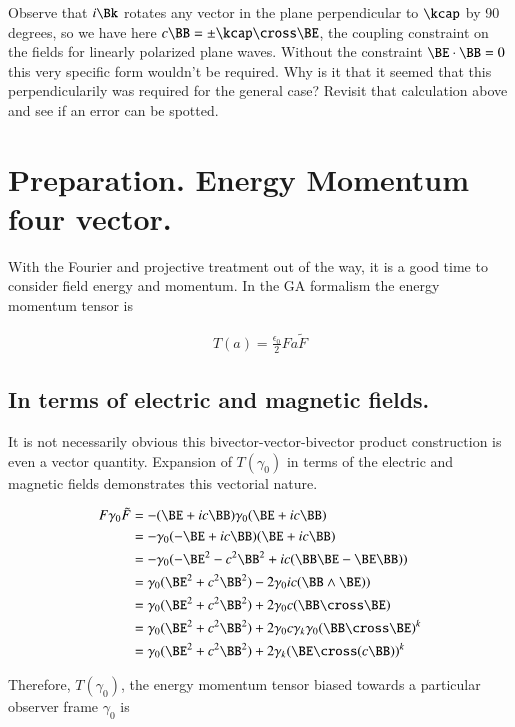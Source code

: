 Observe that $i\Bk$ rotates any vector in the plane perpendicular to $\kcap$ by 90 degrees,
so we have here $c \BB = \pm \kcap \cross \BE$, the coupling constraint on the fields for linearly polarized plane
waves.  Without the constraint $\BE \cdot \BB = 0$ this very specific form wouldn't be required.  Why is it that it seemed
that this perpendicularily was required for the general case?  Revisit that calculation above and see if an error can be spotted.

\section{Preparation.  Energy Momentum four vector.}

With the Fourier and projective treatment out of the way, it is a good time to consider field energy and momentum.  In the GA formalism the energy momentum tensor is

\begin{align}
T(a) = \frac{\epsilon_0}{2} F a \tilde{F}
\end{align}

\subsection{ In terms of electric and magnetic fields. }

It is not necessarily obvious this bivector-vector-bivector product construction is even a vector quantity.  Expansion of $T(\gamma_0)$ in terms of the electric and magnetic fields demonstrates this vectorial nature.

\begin{align*}
F \gamma_0 \tilde{F}
&=
-(\BE + i c \BB) \gamma_0 (\BE + i c \BB) \\
&=
-\gamma_0 (-\BE + i c \BB) (\BE + i c \BB) \\
&=
-\gamma_0 (-\BE^2 - c^2 \BB^2 + i c (\BB \BE - \BE \BB) ) \\
&=
\gamma_0 (\BE^2 + c^2 \BB^2) - 2 \gamma_0 i c (\BB \wedge \BE) ) \\
&=
\gamma_0 (\BE^2 + c^2 \BB^2) + 2 \gamma_0 c (\BB \cross \BE) \\
&=
\gamma_0 (\BE^2 + c^2 \BB^2) + 2 \gamma_0 c \gamma_k \gamma_0 (\BB \cross \BE)^k \\
&=
\gamma_0 (\BE^2 + c^2 \BB^2) + 2 \gamma_k (\BE \cross (c \BB))^k \\
\end{align*}

Therefore, $T(\gamma_0)$, the energy momentum tensor biased towards a particular observer frame $\gamma_0$
is

